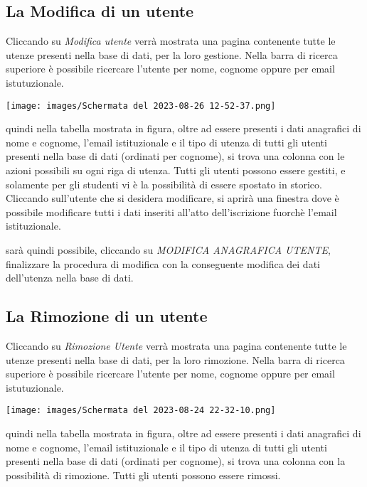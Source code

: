 \documentclass{article}
\begin{document}
    \pagebreak

    \subsection{La Modifica di un utente}
    Cliccando su \textit{Modifica utente} verrà mostrata una pagina contenente tutte le utenze presenti nella base di dati, per la loro gestione. Nella barra di ricerca superiore è possibile ricercare l'utente per nome, cognome oppure per email istutuzionale.

    \begin{center}
        \texttt{[image: images/Schermata del 2023-08-26 12-52-37.png]}
    \end{center}

    quindi nella tabella mostrata in figura, oltre ad essere presenti i dati anagrafici di nome e cognome, l'email istituzionale e il tipo di utenza di tutti gli utenti presenti nella base di dati (ordinati per cognome), si trova una colonna con le azioni possibili su ogni riga di utenza. Tutti gli utenti possono essere gestiti, e solamente per gli studenti vi è la possibilità di essere spostato in storico.
    Cliccando sull'utente che si desidera modificare, si aprirà una finestra dove è possibile modificare tutti i dati inseriti all'atto dell'iscrizione fuorchè l'email istituzionale.

    sarà quindi possibile, cliccando su \textit{MODIFICA ANAGRAFICA UTENTE}, finalizzare la procedura di modifica con la conseguente modifica dei dati dell'utenza nella base di dati.

    \pagebreak

    \subsection{La Rimozione di un utente}
    Cliccando su \textit{Rimozione Utente} verrà mostrata una pagina contenente tutte le utenze presenti nella base di dati, per la loro rimozione. Nella barra di ricerca superiore è possibile ricercare l'utente per nome, cognome oppure per email istutuzionale.

    \begin{center}
        \texttt{[image: images/Schermata del 2023-08-24 22-32-10.png]}
    \end{center}

    quindi nella tabella mostrata in figura, oltre ad essere presenti i dati anagrafici di nome e cognome, l'email istituzionale e il tipo di utenza di tutti gli utenti presenti nella base di dati (ordinati per cognome), si trova una colonna con la possibilità di rimozione. Tutti gli utenti possono essere rimossi.
\end{document}
